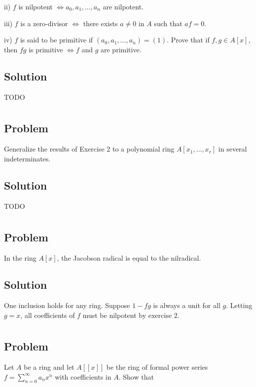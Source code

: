 \documentclass[book,12pt,oneside,openany]{memoir}
\begin{document}
ii) $f$ is nilpotent $\Leftrightarrow a_0, a_1, \ldots, a_n$ are nilpotent.

iii) $f$ is a zero-divisor $\Leftrightarrow$ there exists $a \neq 0$ in $A$ such that $af = 0$.

iv) $f$ is said to be primitive if $(a_0, a_1, \ldots, a_n) = (1)$. Prove that if $f,g \in A[x]$, then $fg$ is primitive $\Leftrightarrow f$ and $g$ are primitive.

\subsection{Solution}
TODO

\section{}
\subsection{Problem}
Generalize the results of Exercise 2 to a polynomial ring $A[x_1, \ldots, x_r]$ in several indeterminates.

\subsection{Solution}
TODO

\section{}
\subsection{Problem}
In the ring $A[x]$, the Jacobson radical is equal to the nilradical.

\subsection{Solution}
One inclusion holds for any ring.
Suppose $1-fg$ is always a unit for all $g$.
Letting $g=x$, all coefficients of $f$ must be nilpotent by exercise $2$.

\section{}
\subsection{Problem}
Let $A$ be a ring and let $A[[x]]$ be the ring of formal power series $f = \sum_{n=0}^{\infty} a_n x^n$ with coefficients in $A$. Show that 
\end{document}
